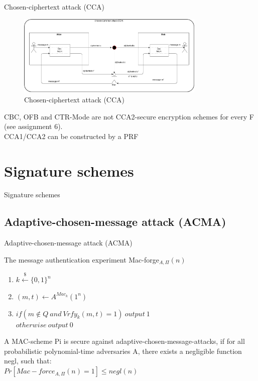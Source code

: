 \documentclass[ucs,9pt]{beamer}
\begin{document}
\begin{frame}{Chosen-ciphertext attack (CCA)}
    
    \begin{figure}[h]
        \centering
        \includegraphics[width=0.8\textwidth]{figures/CCA.png}
        \caption{Chosen-ciphertext attack (CCA)}
    \end{figure}
    CBC, OFB and CTR-Mode are not CCA2-secure encryption schemes for every F (see assignment 6).\\
    CCA1/CCA2 can be constructed by a PRF\\
\end{frame}


%
%
\section{Signature schemes}

\begin{frame}
    \centering
    \huge{Signature schemes}
\end{frame}

\subsection{Adaptive-chosen-message attack (ACMA)}

\begin{frame}{Adaptive-chosen-message attack (ACMA)}
    \begin{block}{The message authentication experiment Mac-forge$_{A,\Pi}(n)$}
        \begin{enumerate}
            \item $k \overset{\$}{\leftarrow} \{0,1\}^n$
            \item $(m, t) \leftarrow A^{Mac_{k}}(1^{n})$
            \item $if(m \notin Q\ and\ Vrfy_{k}(m, t) = 1)\ output\ 1$\\
            $otherwise\ output\ 0$
        \end{enumerate}
        
        A MAC-scheme Pi is secure against adaptive-chosen-message-attacks, if for all probabilistic polynomial-time adversaries A, there exists a negligible function negl, such that:\\
        $Pr[Mac-force_{A,\Pi}(n) = 1] \leq negl(n)$
    \end{block}
\end{frame}
\end{document}
